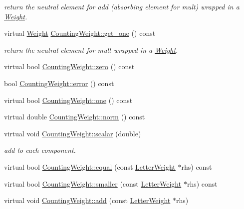 \begin{DoxyCompactItemize}
\begin{DoxyCompactList}\small\item\em return the neutral element for add (absorbing element for mult) wrapped in a \mbox{\hyperlink{classWeight}{Weight}}. \end{DoxyCompactList}\item 
\mbox{\label{group__weight_ga0a589d8beac0f16f54f7e4f451adc843}} 
virtual \mbox{\hyperlink{classWeight}{Weight}} \mbox{\hyperlink{group__weight_ga0a589d8beac0f16f54f7e4f451adc843}{Counting\+Weight\+::get\+\_\+one}} () const
\begin{DoxyCompactList}\small\item\em return the neutral element for mult wrapped in a \mbox{\hyperlink{classWeight}{Weight}}. \end{DoxyCompactList}\item 
virtual bool \mbox{\hyperlink{group__weight_ga62b599ef59770e981d17d565e6727ca9}{Counting\+Weight\+::zero}} () const
\item 
bool \mbox{\hyperlink{group__weight_ga41f35b8902b2474f1ac39878a40f5ca5}{Counting\+Weight\+::error}} () const
\item 
virtual bool \mbox{\hyperlink{group__weight_ga5189380be1ac03126180846e3a8fd1cb}{Counting\+Weight\+::one}} () const
\item 
virtual double \mbox{\hyperlink{group__weight_gabb8ca43a6821de970e8f6b23c848c804}{Counting\+Weight\+::norm}} () const
\item 
\mbox{\label{group__weight_gabb65ce9f0f34112159f6689a36594470}} 
virtual void \mbox{\hyperlink{group__weight_gabb65ce9f0f34112159f6689a36594470}{Counting\+Weight\+::scalar}} (double)
\begin{DoxyCompactList}\small\item\em add to each component. \end{DoxyCompactList}\item 
virtual bool \mbox{\hyperlink{group__weight_ga33f06a811859bdbbf1c0ad2e34299df9}{Counting\+Weight\+::equal}} (const \mbox{\hyperlink{classLetterWeight}{Letter\+Weight}} $\ast$rhs) const
\item 
virtual bool \mbox{\hyperlink{group__weight_ga149e9ae84c83b9235d512c68fec54d1c}{Counting\+Weight\+::smaller}} (const \mbox{\hyperlink{classLetterWeight}{Letter\+Weight}} $\ast$rhs) const
\item 
virtual void \mbox{\hyperlink{group__weight_ga01ca779f7d5378564f4419150d7ae1f5}{Counting\+Weight\+::add}} (const \mbox{\hyperlink{classLetterWeight}{Letter\+Weight}} $\ast$rhs)

\end{DoxyCompactItemize}
